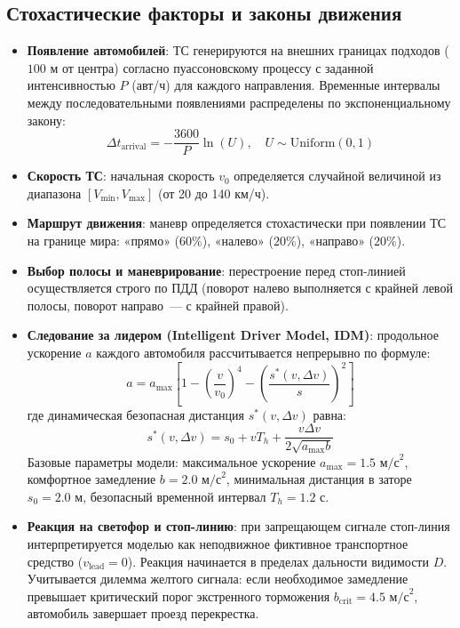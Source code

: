 \documentclass[11pt, a4paper]{article}
\begin{document}
\subsection{Стохастические факторы и законы движения}
\begin{itemize}
  \item \textbf{Появление автомобилей}: ТС генерируются на внешних границах подходов ($100\text{ м}$ от центра) согласно пуассоновскому процессу с заданной интенсивностью $P$ (авт/ч) для каждого направления. Временные интервалы между последовательными появлениями распределены по экспоненциальному закону:
  \begin{equation}
    \Delta t_{\text{arrival}} = -\frac{3600}{P} \ln(U), \quad U \sim \text{Uniform}(0, 1)
  \end{equation}
  \item \textbf{Скорость ТС}: начальная скорость $v_0$ определяется случайной величиной из диапазона $[V_{\min}, V_{\max}]$ (от 20 до 140 км/ч).
  \item \textbf{Маршрут движения}: маневр определяется стохастически при появлении ТС на границе мира: «прямо» ($60\%$), «налево» ($20\%$), «направо» ($20\%$).
  \item \textbf{Выбор полосы и маневрирование}: перестроение перед стоп-линией осуществляется строго по ПДД (поворот налево выполняется с крайней левой полосы, поворот направо~--- с крайней правой).
  \item \textbf{Следование за лидером (Intelligent Driver Model, IDM)}: продольное ускорение $a$ каждого автомобиля рассчитывается непрерывно по формуле:
  \begin{equation}
    a = a_{\max} \left[ 1 - \left(\frac{v}{v_0}\right)^4 - \left(\frac{s^*(v, \Delta v)}{s}\right)^2 \right]
  \end{equation}
  где динамическая безопасная дистанция $s^*(v, \Delta v)$ равна:
  \begin{equation}
    s^*(v, \Delta v) = s_0 + v T_h + \frac{v \Delta v}{2 \sqrt{a_{\max} b}}
  \end{equation}
  Базовые параметры модели: максимальное ускорение $a_{\max} = 1.5\text{ м/с}^2$, комфортное замедление $b = 2.0\text{ м/с}^2$, минимальная дистанция в заторе $s_0 = 2.0\text{ м}$, безопасный временной интервал $T_h = 1.2\text{ с}$.
  \item \textbf{Реакция на светофор и стоп-линию}: при запрещающем сигнале стоп-линия интерпретируется моделью как неподвижное фиктивное транспортное средство ($v_{\text{lead}} = 0$). Реакция начинается в пределах дальности видимости $D$. Учитывается дилемма желтого сигнала: если необходимое замедление превышает критический порог экстренного торможения $b_{\text{crit}} = 4.5\text{ м/с}^2$, автомобиль завершает проезд перекрестка.

\end{itemize}
\end{document}
